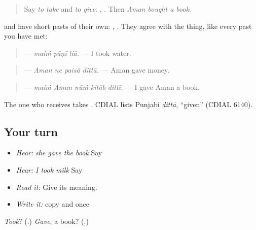 \label{lesson:PA-C220-lia-ditta}



\begin{quote}
Say \emph{to take} and \emph{to give}: \textbf{}, \textbf{}. Then \emph{Aman bought a book}.
\end{quote}

\begin{grammarlens}[title={Grammar Lens: two short pasts}]
\textbf{} and \textbf{} have short pasts of their own: \textbf{}, \textbf{}. They agree with the thing, like every past you have met:

\begin{quote}
\textbf{  } — \emph{maiṁ pāṇī liā.} — I took water.
\end{quote}

\begin{quote}
\textbf{   } — \emph{Aman ne paisā dittā.} — Aman gave money.
\end{quote}

\begin{quote}
\textbf{    } — \emph{maiṁ Aman nūṁ kitāb dittī.} — I gave Aman a book.
\end{quote}

The one who receives takes \textbf{}. CDIAL lists Punjabi \emph{dittā}, \textquotedblleft{}given\textquotedblright{} (CDIAL 6140).
\end{grammarlens}

\subsection*{Your turn}
\begin{itemize}
\raggedright
  \item \emph{Hear:} \emph{she gave the book} Say \textbf{   }
  \item \emph{Hear:} \emph{I took milk} Say \textbf{  }
  \item \emph{Read it:} \textbf{    } Give its meaning.
  \item \emph{Write it:} copy \textbf{} and \textbf{} once
\end{itemize}

\begin{tcolorbox}[breakable,colback=teal!4,colframe=teal!35!black,title={Before you move on}]
\emph{Took}? (\textbf{}.) \emph{Gave}, a book? (\textbf{}.)
\end{tcolorbox}
